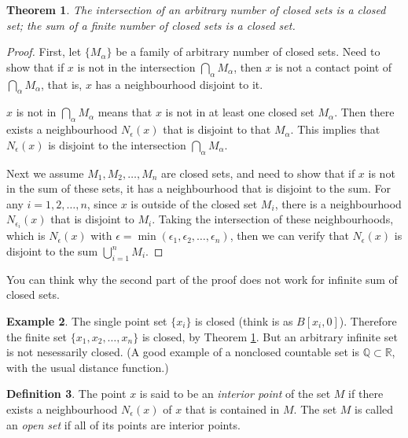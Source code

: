 \documentclass[a4paper,12pt]{article}
\newcommand{\realR}{\mathbb{R}}
\newcommand{\ratQ}{\mathbb{Q}}
\newtheorem{thm}{Theorem}[section]
\theoremstyle{definition}
\newtheorem{defn}[thm]{Definition}
\newtheorem{expl}[thm]{Example}
\theoremstyle{remark}
\begin{document}
\begin{thm} \label{thm:intersection_and_sum_of_closed_sets}
  The intersection of an arbitrary number of closed sets is a closed set; the sum of a finite number of closed sets is a closed set.
\end{thm}

\begin{proof}
  First, let $\{ M_{\alpha} \}$ be a family of arbitrary number of closed sets. Need to show that if $x$ is not in the intersection $\bigcap_{\alpha} M_{\alpha}$, then $x$ is not a contact point of $\bigcap_{\alpha} M_{\alpha}$, that is, $x$ has a neighbourhood disjoint to it.

  $x$ is not in $\bigcap_{\alpha} M_{\alpha}$ means that $x$ is not in at least one closed set $M_{\alpha}$. Then there exists a neighbourhood $N_{\epsilon}(x)$ that is disjoint to that $M_{\alpha}$. This implies that $N_{\epsilon}(x)$ is disjoint to the intersection $\bigcap_{\alpha} M_{\alpha}$.

  Next we assume $M_1, M_2, \dotsc, M_n$ are closed sets, and need to show that if $x$ is not in the sum of these sets, it has a neighbourhood that is disjoint to the sum. For any $i = 1, 2, \dotsc, n$, since $x$ is outside of the closed set $M_i$, there is a neighbourhood $N_{\epsilon_i}(x)$ that is disjoint to $M_i$. Taking the intersection of these neighbourhoods, which is $N_{\epsilon}(x)$ with $\epsilon = \min(\epsilon_1, \epsilon_2, \dotsc, \epsilon_n)$, then we can verify that $N_{\epsilon}(x)$ is disjoint to the sum $\bigcup^n_{i=1} M_i$.
\end{proof}
You can think why the second part of the proof does not work for infinite sum of closed sets.

\begin{expl}
  The single point set $\{ x_i \}$ is closed (think is as $B[x_i, 0]$). Therefore the finite set $\{x_1, x_2, \dotsc, x_n \}$ is closed, by Theorem \ref{thm:intersection_and_sum_of_closed_sets}. But an arbitrary infinite set is not nesessarily closed. (A good example of a nonclosed countable set is $\ratQ \subset \realR$, with the usual distance function.)
\end{expl}

\begin{defn}
  The point $x$ is said to be an \emph{interior point} of the set $M$ if there exists a neighbourhood $N_{\epsilon}(x)$ of $x$ that is contained in $M$. The set $M$ is called an \emph{open set} if all of its points are interior points.
\end{defn}
\end{document}
